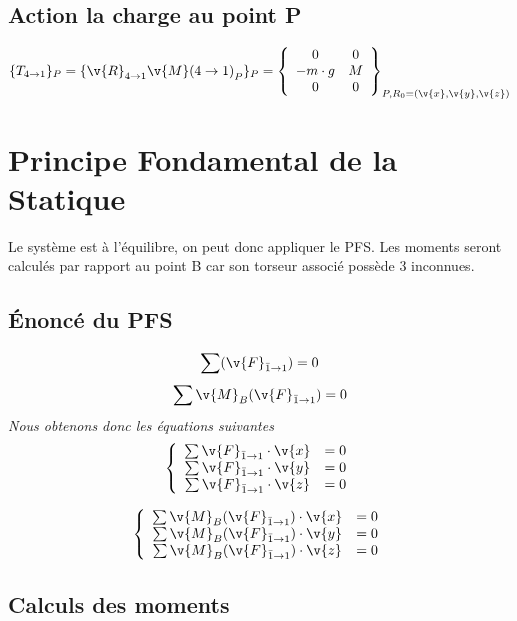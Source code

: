\subsection{Action la charge au point P}
$\{T_{4 \rightarrow 1}\}_P = \{ {\v{R}_{4 \rightarrow 1} \v{M}(4 \rightarrow 1)}_P\}_P =
\left\{ \begin{array}{ccc}
0&0\\
-m\cdot g&M\\
0&0\\
\end{array}
\right\}_{P,R_0=(\v{x}, \v{y}, \v{z})}
$

\section{Principe Fondamental de la Statique}

Le système est à l'équilibre, on peut donc appliquer le PFS. \newline
Les moments seront calculés par rapport au point B car son torseur associé possède 3 inconnues.
\subsection{Énoncé du PFS}
$$\sum(\v{F}_{\bar 1 \rightarrow 1}) = 0$$
$$\sum\v{M}_B(\v{F}_{\bar 1 \rightarrow 1}) = 0$$
\textit{Nous obtenons donc les équations suivantes} \newline
$$ \left\{
\begin{array}{ccc}
\sum \v{F}_{\bar 1 \rightarrow 1}\cdot \v{x} & = 0 \\
\sum \v{F}_{\bar 1 \rightarrow 1}\cdot \v{y} & = 0 \\
\sum \v{F}_{\bar 1 \rightarrow 1}\cdot \v{z} & = 0
\end{array}
\right.
$$


$$ \left\{
\begin{array}{ccc}
\sum \v{M}_B(\v{F}_{\bar 1 \rightarrow 1})\cdot \v{x} & = 0 \\
\sum \v{M}_B(\v{F}_{\bar 1 \rightarrow 1})\cdot \v{y} & = 0 \\
\sum \v{M}_B(\v{F}_{\bar 1 \rightarrow 1})\cdot \v{z} & = 0 
\end{array}
\right.
$$



\subsection{Calculs des moments}


